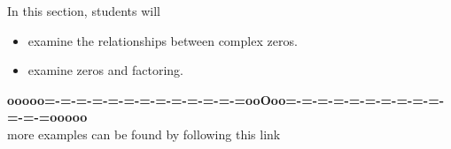 \documentclass{ximera}
\begin{document}
\begin{sectionOutcomes}
In this section, students will 

\begin{itemize}
\item examine the relationships between complex zeros.
\item examine zeros and factoring.
\end{itemize}
\end{sectionOutcomes}










\begin{center}
\textbf{\textcolor{green!50!black}{ooooo=-=-=-=-=-=-=-=-=-=-=-=-=ooOoo=-=-=-=-=-=-=-=-=-=-=-=-=ooooo}} \\

more examples can be found by following this link\\ 

\end{center}
\end{document}

